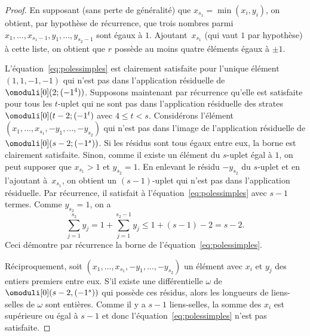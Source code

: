 \begin{proof}
En supposant (sans perte de généralité) que $x_{s_{1}}=\min(x_{i},y_{i})$, on obtient, par hypothèse de récurrence, que trois nombres parmi $x_{1},\dots,x_{s_{1}-1},y_{1},\dots,y_{s_{2}-1}$ sont égaux à $1$. Ajoutant~$x_{s_{1}}$ (qui vaut $1$ par hypothèse) à cette liste, on obtient que $r$ possède au moins quatre éléments égaux à $\pm 1$.

L'équation~\eqref{eq:polessimples} est clairement satisfaite pour l'unique élément $(1,1,-1,-1)$ qui n'est pas dans l'application résiduelle de $\omoduli[0](2;(-1^{4}))$. Supposons maintenant par récurrence qu'elle est satisfaite pour tous les $t$-uplet qui ne sont pas dans l'application résiduelle des strates $\omoduli[0](t-2;(-1^{t})$ avec $4 \leq t<s$. Considérons l'élément $(x_{1},\dots,x_{s_{1}},-y_{1},\dots,-y_{s_{2}})$ qui n'est pas dans l'image de l'application résiduelle de $\omoduli[0](s-2;(-1^{s}))$.
Si les résidus sont tous égaux entre eux, la borne est clairement satisfaite. Sinon, comme il existe un élément du $s$-uplet égal à $1$, on peut supposer que $x_{s_{1}}>1$ et $y_{s_{2}}=1$. En enlevant le résidu $-y_{s_{2}}$ du $s$-uplet et en l'ajoutant à~$x_{s_{1}}$, on obtient un $(s-1)$-uplet qui n'est pas dans l'application résiduelle. Par récurrence, il satisfait à l'équation~\eqref{eq:polessimples} avec $s-1$ termes. Comme $y_{s_{2}} = 1$, on a\vspace*{-3pt}
\[
\sum_{j=1}^{s_{2}} y_{j} = 1 + \sum_{j=1}^{s_{2}-1} y_{j} \leq 1 + (s-1)-2 = s-2.\]
Ceci démontre par récurrence la borne de l'équation~\eqref{eq:polessimples}.

Réciproquement, soit $(x_{1},\dots,x_{s_{1}},-y_{1},\dots,-y_{s_{2}})$ un élément avec $x_{i}$ et $y_{j}$ des entiers premiers entre eux. S'il existe une différentielle $\omega$ de $\omoduli[0](s-2,(-1^{s}))$ qui possède ces résidus, alors les longueurs de liens-selles de $\omega$ sont entières. Comme il y a $s-1$ liens-selles, la somme des $x_{i}$ est supérieure ou égal à $s-1$ et donc l'équation~\eqref{eq:polessimples} n'est pas satisfaite.
\end{proof}

